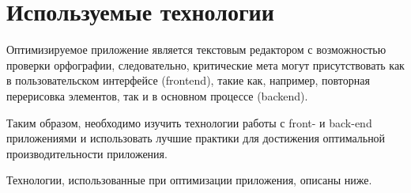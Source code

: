 \section{Используемые технологии}

Оптимизируемое приложение является текстовым редактором с возможностью проверки орфографии, следовательно, критические мета могут присутствовать как в пользовательском интерфейсе (frontend), такие как, например, повторная перерисовка элементов, так и в основном процессе (backend).

Таким образом, необходимо изучить технологии работы с front- и back-end приложениями и использовать лучшие практики для достижения оптимальной производительности приложения.

Технологии, использованные при оптимизации приложения, описаны ниже.






